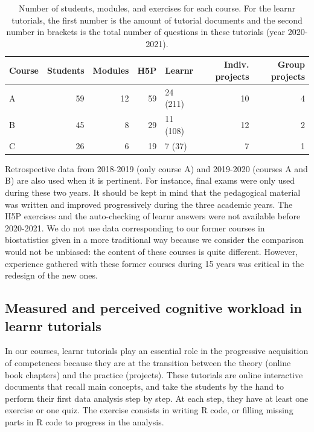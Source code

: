 \documentclass{aims}
\theoremstyle{definition}
\begin{document}
\begin{table}

\caption{\label{tab:tab_course_summary}\label{tab:tab_course} Number of students, modules, and exercises for each course. For the learnr tutorials, the first number is the amount of tutorial documents and the second number in brackets is the total number of questions in these tutorials (year 2020-2021).}
\centering
\begin{tabular}[t]{l|r|r|r|l|r|r}
\hline
Course & Students & Modules & H5P & Learnr & Indiv. projects & Group projects\\
\hline
A & 59 & 12 & 59 & 24 (211) & 10 & 4\\
\hline
B & 45 & 8 & 29 & 11 (108) & 12 & 2\\
\hline
C & 26 & 6 & 19 & 7 (37) & 7 & 1\\
\hline
\end{tabular}
\end{table}

Retrospective data from 2018-2019 (only course A) and 2019-2020 (courses
A and B) are also used when it is pertinent. For instance, final exams
were only used during these two years. It should be kept in mind that
the pedagogical material was written and improved progressively during
the three academic years. The H5P exercises and the auto-checking of
learnr answers were not available before 2020-2021. We do not use data
corresponding to our former courses in biostatistics given in a more
traditional way because we consider the comparison would not be
unbiased: the content of these courses is quite different. However,
experience gathered with these former courses during 15 years was
critical in the redesign of the new ones.

\hypertarget{measured-and-perceived-cognitive-workload-in-learnr-tutorials-1}{%
\subsection{Measured and perceived cognitive workload in learnr
tutorials}\label{measured-and-perceived-cognitive-workload-in-learnr-tutorials-1}}

In our courses, learnr tutorials play an essential role in the
progressive acquisition of competences because they are at the
transition between the theory (online book chapters) and the practice
(projects). These tutorials are online interactive documents that recall
main concepts, and take the students by the hand to perform their first
data analysis step by step. At each step, they have at least one
exercise or one quiz. The exercise consists in writing R code, or
filling missing parts in R code to progress in the analysis.
\end{document}
